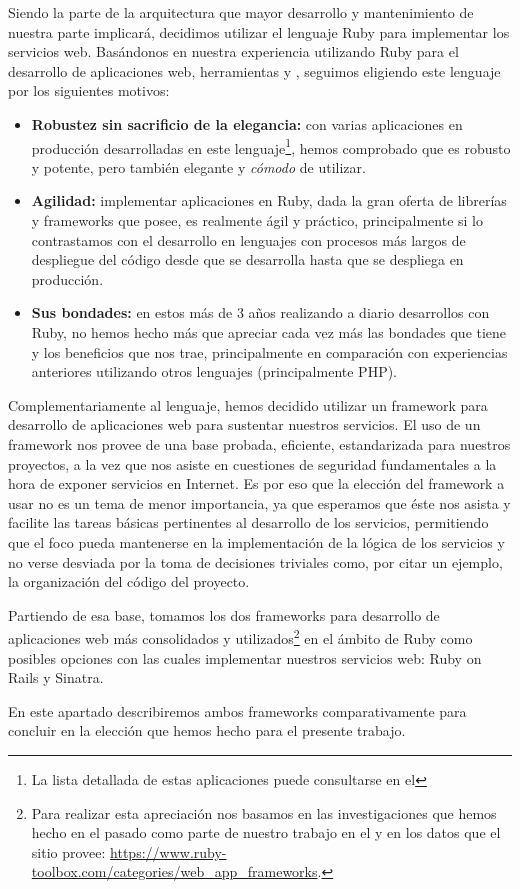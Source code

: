 Siendo la parte de la arquitectura que mayor desarrollo y mantenimiento de nuestra parte implicará, decidimos utilizar el lenguaje Ruby para implementar los servicios web. Basándonos en nuestra experiencia utilizando Ruby para el desarrollo de aplicaciones web, herramientas y , seguimos eligiendo este lenguaje por los siguientes motivos:

\begin{itemize}
  \item \textbf{Robustez sin sacrificio de la elegancia:} con varias aplicaciones en producción desarrolladas en este lenguaje\footnote{La lista detallada de estas aplicaciones puede consultarse en el }, hemos comprobado que es robusto y potente, pero también elegante y \textit{cómodo} de utilizar.
  \item \textbf{Agilidad:} implementar aplicaciones en Ruby, dada la gran oferta de librerías y frameworks que posee, es realmente ágil y práctico, principalmente si lo contrastamos con el desarrollo en lenguajes con procesos más largos de despliegue del código desde que se desarrolla hasta que se despliega en producción.
  \item \textbf{Sus bondades:} en estos más de 3 años realizando a diario desarrollos con Ruby, no hemos hecho más que apreciar cada vez más las bondades que tiene y los beneficios que nos trae, principalmente en comparación con experiencias anteriores utilizando otros lenguajes (principalmente PHP).
\end{itemize}

Complementariamente al lenguaje, hemos decidido utilizar un framework para desarrollo de aplicaciones web para sustentar nuestros servicios. El uso de un framework nos provee de una base probada, eficiente, estandarizada para nuestros proyectos, a la vez que nos asiste en cuestiones de seguridad fundamentales a la hora de exponer servicios en Internet. Es por eso que la elección del framework a usar no es un tema de menor importancia, ya que esperamos que éste nos asista y facilite las tareas básicas pertinentes al desarrollo de los servicios, permitiendo que el foco pueda mantenerse en la implementación de la lógica de los servicios y no verse desviada por la toma de decisiones triviales como, por citar un ejemplo, la organización del código del proyecto.

Partiendo de esa base, tomamos los dos frameworks para desarrollo de aplicaciones web más consolidados y utilizados\footnote{Para realizar esta apreciación nos basamos en las investigaciones que hemos hecho en el pasado como parte de nuestro trabajo en el {\cespi} y en los datos que el sitio  provee: \url{https://www.ruby-toolbox.com/categories/web_app_frameworks}.} en el ámbito de Ruby como posibles opciones con las cuales implementar nuestros servicios web: Ruby on Rails y Sinatra.

En este apartado describiremos ambos frameworks comparativamente para concluir en la elección que hemos hecho para el presente trabajo.
